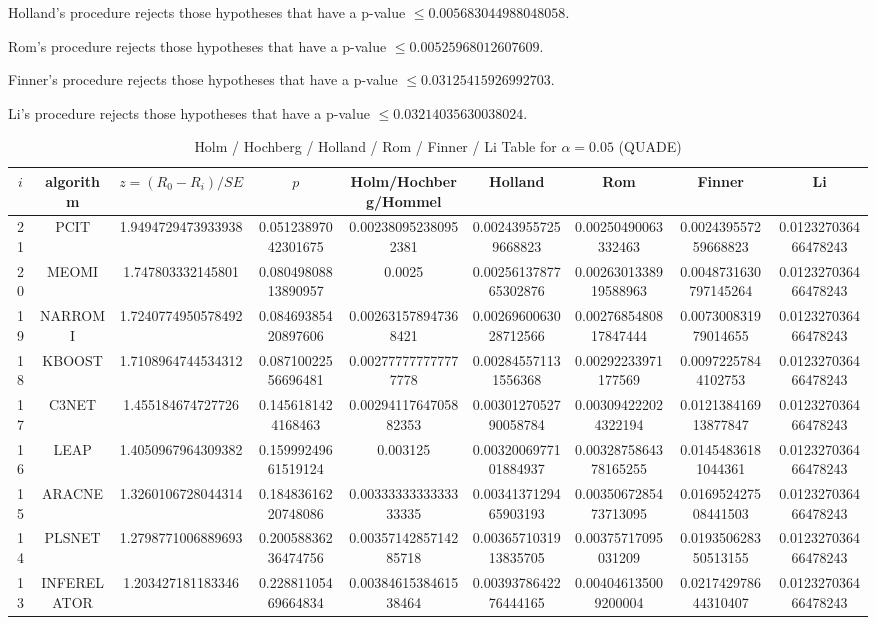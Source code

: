 \documentclass[a4paper,10pt]{article}
\begin{document}
\begin{landscape}
Holland's procedure rejects those hypotheses that have a p-value $\le0.005683044988048058$.


Rom's procedure rejects those hypotheses that have a p-value $\le0.00525968012607609$.


Finner's procedure rejects those hypotheses that have a p-value $\le0.03125415926992703$.


Li's procedure rejects those hypotheses that have a p-value $\le0.03214035630038024$.



\newpage

\begin{table}[!htp]
\centering\scriptsize
\caption{Holm / Hochberg / Holland / Rom / Finner / Li Table for $\alpha=0.05$ (QUADE)}
\begin{tabular}{ccccccccc}
$i$&algorithm&$z=(R_0 - R_i)/SE$&$p$&Holm/Hochberg/Hommel&Holland&Rom&Finner&Li\\
\hline
21&PCIT&1.9494729473933938&0.05123897042301675&0.002380952380952381&0.002439557259668823&0.00250490063332463&0.002439557259668823&0.012327036466478243\\
20&MEOMI&1.747803332145801&0.08049808813890957&0.0025&0.0025613787765302876&0.0026301338919588963&0.0048731630797145264&0.012327036466478243\\
19&NARROMI&1.7240774950578492&0.08469385420897606&0.002631578947368421&0.0026960063028712566&0.0027685480817847444&0.007300831979014655&0.012327036466478243\\
18&KBOOST&1.7108964744534312&0.08710022556696481&0.002777777777777778&0.002845571131556368&0.00292233971177569&0.00972257844102753&0.012327036466478243\\
17&C3NET&1.455184674727726&0.1456181424168463&0.0029411764705882353&0.0030127052790058784&0.003094222024322194&0.012138416913877847&0.012327036466478243\\
16&LEAP&1.4050967964309382&0.15999249661519124&0.003125&0.0032006977101884937&0.0032875864378165255&0.01454836181044361&0.012327036466478243\\
15&ARACNE&1.3260106728044314&0.18483616220748086&0.0033333333333333335&0.0034137129465903193&0.0035067285473713095&0.016952427508441503&0.012327036466478243\\
14&PLSNET&1.2798771006889693&0.20058836236474756&0.0035714285714285718&0.0036571031913835705&0.00375717095031209&0.019350628350513155&0.012327036466478243\\
13&INFERELATOR&1.203427181183346&0.22881105469664834&0.0038461538461538464&0.0039378642276444165&0.004046135009200004&0.021742978644310407&0.012327036466478243\\

\end{tabular}
\end{table}
\end{landscape}
\end{document}
